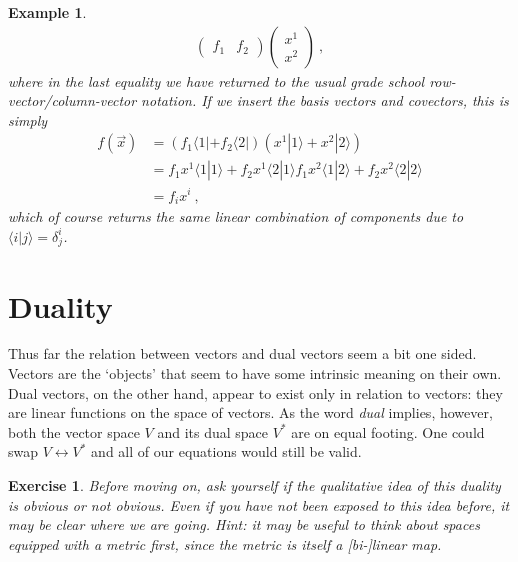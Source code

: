 \documentclass[
  11pt,
	colorful,
	raggedright,
]{tufte-style-thesis-flip}
\newtheorem{exercise}{Exercise}[section]
\newtheorem{example}{Example}[section]
\begin{document}
\begin{example}
\begin{align}
\begin{pmatrix}
    f_1 & f_2
  \end{pmatrix}
  \begin{pmatrix}
    x^1 \\ x^2
  \end{pmatrix} \ ,
\end{align}
where in the last equality we have returned to the usual grade school row-vector/column-vector notation. If we insert the basis vectors and covectors, this is simply
\begin{align}
  f(\vec{x}) &= 
  \left(f_1 \langle 1| + f_2 \langle 2|\right)
  \left(x^1|1\rangle + x^2|2\rangle\right) 
  \\
  &= 
  f_1 x^1 \langle 1|1\rangle + f_2 x^1 \langle 2|1\rangle
  f_1 x^2 \langle 1|2\rangle + f_2 x^2 \langle 2|2\rangle
  \\
  &= f_ix^i
  \ ,
\end{align}
which of course returns the same linear combination of components due to $\langle i | j\rangle = \delta^i_j$.
\end{example}

\section{Duality}

Thus far the relation between vectors and dual vectors seem a bit one sided. Vectors are the `objects' that seem to have some intrinsic meaning on their own. Dual vectors, on the other hand, appear to exist only in relation to vectors: they are linear functions on the space of vectors. As the word \emph{dual} implies, however, both the vector space $V$ and its dual space $V^*$ are on equal footing. One could swap $V\leftrightarrow V^*$ and all of our equations would still be valid. 

\begin{exercise}
Before moving on, ask yourself if the qualitative idea of this duality is obvious or not obvious. Even if you have not been exposed to this idea before, it may be clear where we are going. Hint: it may be useful to think about spaces equipped with a metric first, since the metric is itself a [bi-]linear map. 
\end{exercise}
\end{document}

